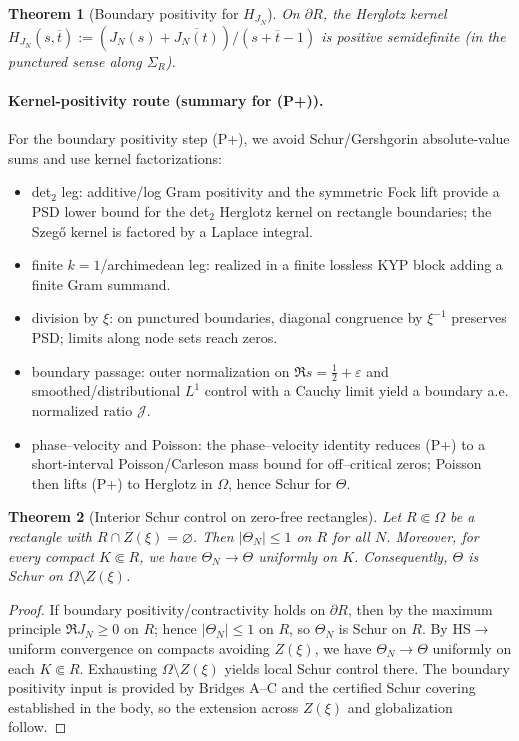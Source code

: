 \documentclass[11pt]{article}
\newtheorem{theorem}{Theorem}
\theoremstyle{definition}
\theoremstyle{remark}
\DeclareMathOperator{\dettwo}{det_2}
\begin{document}
\begin{theorem}[Boundary positivity for \(H_{J_N}\)]\label{thm:boundary-psd-formal}
On \(\partial R\), the Herglotz kernel \(H_{J_N}(s,\overline t):=(J_N(s)+\overline{J_N(t)})/(s+\overline t-1)\) is positive semidefinite (in the punctured sense along \(\Sigma_R\)).
\end{theorem}

\paragraph{Kernel-positivity route (summary for (P+)).}
For the boundary positivity step (P+), we avoid Schur/Gershgorin absolute-value sums and use kernel factorizations:
\begin{itemize}
 \item det$_2$ leg: additive/log Gram positivity and the symmetric Fock lift provide a PSD lower bound for the det$_2$ Herglotz kernel on rectangle boundaries; the Szeg\H{o} kernel is factored by a Laplace integral.
 \item finite $k{=}1$/archimedean leg: realized in a finite lossless KYP block adding a finite Gram summand.
 \item division by $\xi$: on punctured boundaries, diagonal congruence by $\xi^{-1}$ preserves PSD; limits along node sets reach zeros.
 \item boundary passage: outer normalization on $\Re s=\tfrac12+\varepsilon$ and smoothed/distributional $L^1$ control with a Cauchy limit yield a boundary a.e. normalized ratio $\mathcal J$.
 \item phase–velocity and Poisson: the phase–velocity identity reduces (P+) to a short-interval Poisson/Carleson mass bound for off–critical zeros; Poisson then lifts (P+) to Herglotz in $\Omega$, hence Schur for $\Theta$.
\end{itemize}
\begin{theorem}[Interior Schur control on zero-free rectangles]\label{thm:UIC}
Let \(R\Subset\Omega\) be a rectangle with \(R\cap Z(\xi)=\varnothing\). Then \(|\Theta_N|\le 1\) on \(R\) for all \(N\). Moreover, for every compact \(K\Subset R\), we have \(\Theta_N\to\Theta\) uniformly on \(K\). Consequently, \(\Theta\) is Schur on \(\Omega\setminus Z(\xi)\).
\end{theorem}
\begin{proof}
If boundary positivity/contractivity holds on \(\partial R\), then by the maximum principle \(\Re J_N\ge0\) on \(R\); hence \(|\Theta_N|\le 1\) on \(R\), so \(\Theta_N\) is Schur on \(R\). By HS\(\to\)\(\dettwo\) uniform convergence on compacts avoiding \(Z(\xi)\), we have \(\Theta_N\to\Theta\) uniformly on each \(K\Subset R\). Exhausting \(\Omega\setminus Z(\xi)\) yields local Schur control there. The boundary positivity input is provided by Bridges A--C and the certified Schur covering established in the body, so the extension across \(Z(\xi)\) and globalization follow.
\end{proof}
\end{document}
